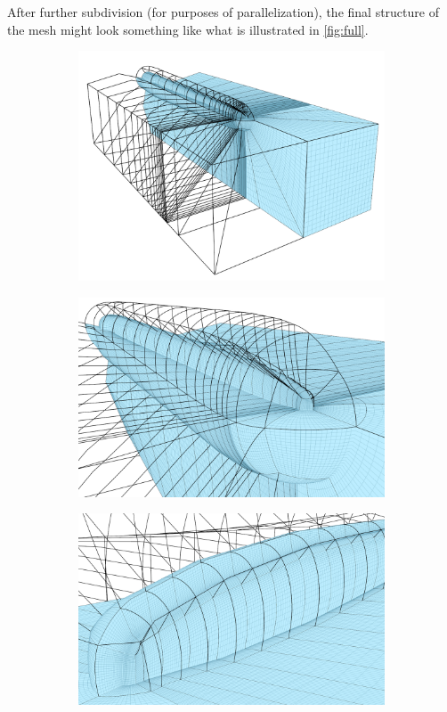 \documentclass{nordic}
\begin{document}
After further subdivision (for purposes of parallelization), the final structure of the mesh might
look something like what is illustrated in \autoref{fig:full}.

\begin{figure}[h!]
  \centering
  \begin{subfigure}[b]{0.30\textwidth}
    \includegraphics[width=\textwidth]{figs/structure-1}
  \end{subfigure}
  \begin{subfigure}[b]{0.30\textwidth}
    \includegraphics[width=\textwidth]{figs/structure-2}
  \end{subfigure}
  \begin{subfigure}[b]{0.30\textwidth}
    \includegraphics[width=\textwidth]{figs/structure-3}

\end{subfigure}
\end{figure}
\end{document}
